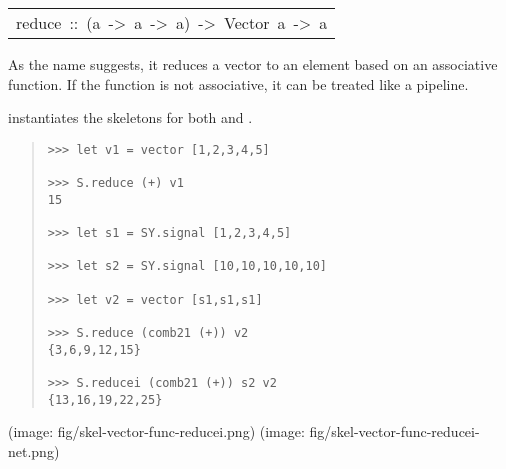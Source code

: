 \begin{haddockdesc}
\item[\begin{tabular}{@{}l}
reduce\ ::\ (a\ ->\ a\ ->\ a)\ ->\ Vector\ a\ ->\ a
\end{tabular}]\haddockbegindoc
As the name suggests, it reduces a vector to an element based on
 an associative function. If the function is not associative, it can be treated like a pipeline.\par
{} instantiates the skeletons for both
  and .\par
\begin{quote}
{\haddockverb\begin{verbatim}
>>> let v1 = vector [1,2,3,4,5]

>>> S.reduce (+) v1
15

>>> let s1 = SY.signal [1,2,3,4,5]

>>> let s2 = SY.signal [10,10,10,10,10]

>>> let v2 = vector [s1,s1,s1]

>>> S.reduce (comb21 (+)) v2
{3,6,9,12,15}

>>> S.reducei (comb21 (+)) s2 v2
{13,16,19,22,25}

\end{verbatim}}
\end{quote}(image: fig/skel-vector-func-reducei.png)
 (image: fig/skel-vector-func-reducei-net.png)\par
           
\end{haddockdesc}
